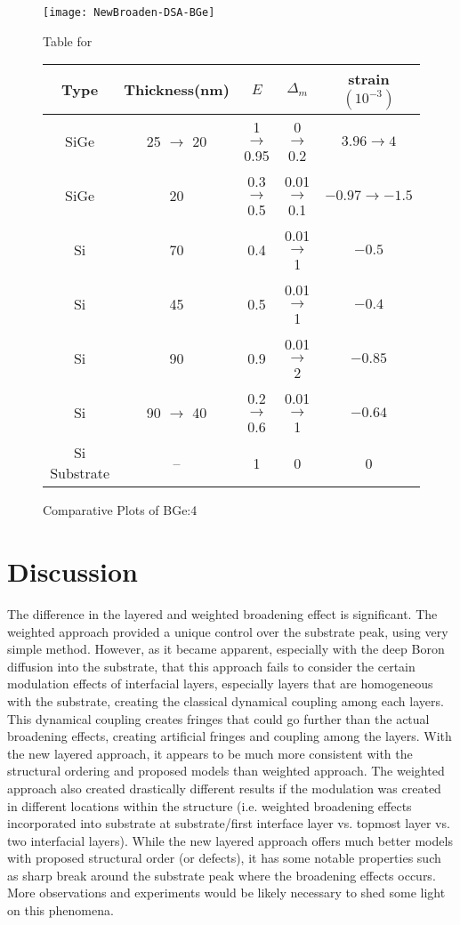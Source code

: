 \begin{figure}[ht]%
\caption{Comparative Plots of BGe:4}
\label{NBGe4:fig}
\begin{minipage}{\linewidth}
\texttt{[image: NewBroaden-DSA-BGe]}
\end{minipage}
\begin{minipage}{\linewidth}
\centering
\vspace{10pt}
Table for \\
\begin{tabular}[htbp]{@{}c|cccc@{}}
    \hline
  Type & Thickness(nm) & $E$ & $\Delta_m$ & strain $(10^{-3})$ \\
    \hline
  SiGe 	& 25  $\rightarrow$ 20& 1  $\rightarrow$ 0.95  & 0  $\rightarrow$ 0.2   & $3.96  \rightarrow 4$  \\
  SiGe 	& 20 & 0.3  $\rightarrow$ 0.5& 0.01  $\rightarrow$0.1& $-0.97 \rightarrow -1.5$  \\
  Si   	& 70 & 0.4 & 0.01  $\rightarrow$ 1& $-0.5		$ \\
  Si 	& 45 & 0.5 & 0.01  $\rightarrow$ 1 & $-0.4		$\\
  Si 	& 90 & 0.9 & 0.01  $\rightarrow$ 2& $-0.85		$\\
  Si 	& 90  $\rightarrow$ 40 & 0.2  $\rightarrow$ 0.6 & 0.01  $\rightarrow$ 1& $-0.64$\\
  Si Substrate & -- & 1 & 0 & 0 
  \end{tabular}
\end{minipage}
\end{figure}

	\section{Discussion}

The difference in the layered and weighted broadening effect is significant.  The  weighted approach provided a unique control over the substrate peak, using very simple method.  However, as it became apparent, especially with the deep Boron diffusion into the substrate, that this approach fails to consider the certain modulation effects of interfacial layers, especially layers that are homogeneous with the substrate, creating the classical dynamical coupling among each layers.  This dynamical coupling creates fringes that could go further than the actual broadening effects, creating artificial fringes and coupling among the layers.   With the new layered approach, it appears to be much more consistent with the structural ordering and proposed models than weighted approach.  The weighted approach also created drastically different results if the modulation was created in different locations within the structure (i.e. weighted broadening effects incorporated into substrate at substrate/first interface layer vs. topmost layer vs. two interfacial layers).  While the new layered approach offers much better models with proposed structural order (or defects), it has some notable properties such as sharp break  around the substrate peak where the broadening effects occurs.  More observations and experiments would be likely necessary to shed some light on this phenomena.

